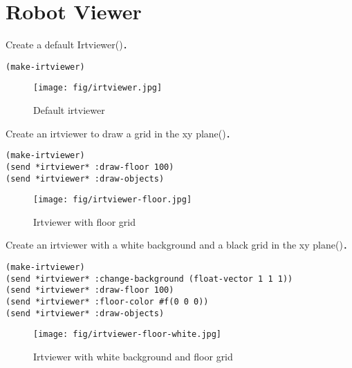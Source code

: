 \section{Robot Viewer}

Create a default Irtviewer()．
\begin{verbatim}
(make-irtviewer)
\end{verbatim}
\begin{figure}[htb]
  \begin{center}
    \texttt{[image: fig/irtviewer.jpg]}
    \caption{Default irtviewer}
  \end{center}
\end{figure}

Create an irtviewer to draw a grid in the xy plane()．
\begin{verbatim}
(make-irtviewer)
(send *irtviewer* :draw-floor 100)
(send *irtviewer* :draw-objects)
\end{verbatim}
\begin{figure}[htb]
  \begin{center}
    \texttt{[image: fig/irtviewer-floor.jpg]}
    \caption{Irtviewer with floor grid}
  \end{center}
\end{figure}

Create an irtviewer with a white background and a black grid in the xy plane()．
\begin{verbatim}
(make-irtviewer)
(send *irtviewer* :change-background (float-vector 1 1 1))
(send *irtviewer* :draw-floor 100)
(send *irtviewer* :floor-color #f(0 0 0))
(send *irtviewer* :draw-objects)
\end{verbatim}
\begin{figure}[htb]
  \begin{center}
    \texttt{[image: fig/irtviewer-floor-white.jpg]}
    \caption{Irtviewer with white background and floor grid}
  \end{center}
\end{figure}



